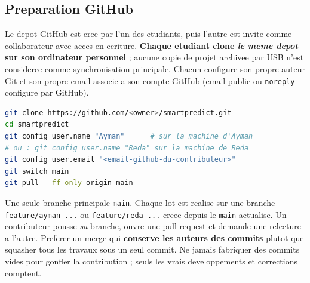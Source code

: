 \documentclass[10pt,a4paper]{article}
\newcommand{\code}[1]{{\small\ttfamily\nolinkurl{#1}}}
\begin{document}
\subsection{Preparation GitHub}
Le depot GitHub est cree par l'un des etudiants, puis l'autre est invite comme collaborateur avec acces en ecriture. \textbf{Chaque etudiant clone \emph{le meme depot} sur son ordinateur personnel} ; aucune copie de projet archivee par USB n'est consideree comme synchronisation principale. Chacun configure son propre auteur Git et son propre email associe a son compte GitHub (email public ou \code{noreply} configure par GitHub).
\begin{lstlisting}[language=bash]
git clone https://github.com/<owner>/smartpredict.git
cd smartpredict
git config user.name "Ayman"      # sur la machine d'Ayman
# ou : git config user.name "Reda" sur la machine de Reda
git config user.email "<email-github-du-contributeur>"
git switch main
git pull --ff-only origin main
\end{lstlisting}
Une seule branche principale \code{main}. Chaque lot est realise sur une branche \code{feature/ayman-...} ou \code{feature/reda-...} creee depuis le \code{main} actualise. Un contributeur pousse \emph{sa} branche, ouvre une pull request et demande une relecture a l'autre. Preferer un merge qui \textbf{conserve les auteurs des commits} plutot que squasher tous les travaux sous un seul commit. Ne jamais fabriquer des commits vides pour gonfler la contribution ; seuls les vrais developpements et corrections comptent.
\end{document}
